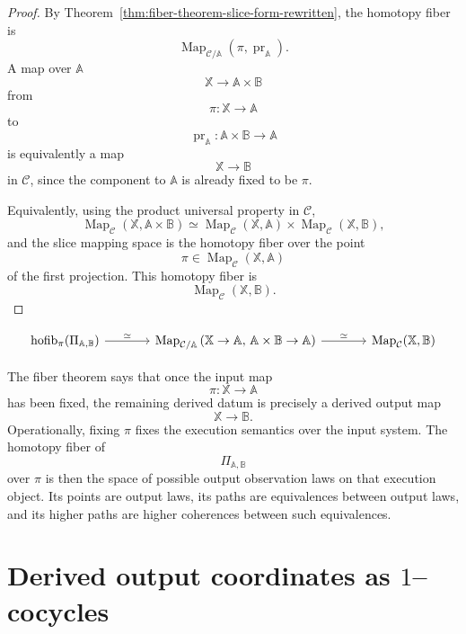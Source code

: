 \begin{proof}
By Theorem~\ref{thm:fiber-theorem-slice-form-rewritten}, the homotopy
fiber is
\[
\operatorname{Map}_{\mathcal C/\mathbb A}
\left(
\pi,\operatorname{pr}_{\mathbb A}
\right).
\]
A map over \(\mathbb A\)
\[
\mathbb X\to\mathbb A\times\mathbb B
\]
from
\[
\pi:\mathbb X\to\mathbb A
\]
to
\[
\operatorname{pr}_{\mathbb A}:\mathbb A\times\mathbb B\to\mathbb A
\]
is equivalently a map
\[
\mathbb X\to\mathbb B
\]
in \(\mathcal C\), since the component to \(\mathbb A\) is already fixed
to be \(\pi\).

Equivalently, using the product universal property in \(\mathcal C\),
\[
\operatorname{Map}_{\mathcal C}
(\mathbb X,\mathbb A\times\mathbb B)
\simeq
\operatorname{Map}_{\mathcal C}(\mathbb X,\mathbb A)
\times
\operatorname{Map}_{\mathcal C}(\mathbb X,\mathbb B),
\]
and the slice mapping space is the homotopy fiber over the point
\[
\pi\in\operatorname{Map}_{\mathcal C}(\mathbb X,\mathbb A)
\]
of the first projection. This homotopy fiber is
\[
\operatorname{Map}_{\mathcal C}(\mathbb X,\mathbb B).
\]
\end{proof}

\[
\begin{tikzcd}[column sep=large]
\operatorname{hofib}_{\pi}(\Pi_{\mathbb A,\mathbb B})
\arrow[r, "\simeq"]
&
\operatorname{Map}_{\mathcal C/\mathbb A}
\left(
\mathbb X\to\mathbb A,\,
\mathbb A\times\mathbb B\to\mathbb A
\right)
\arrow[r, "\simeq"]
&
\operatorname{Map}_{\mathcal C}(\mathbb X,\mathbb B)
\end{tikzcd}
\]

\begin{remark}
\label{rem:fiber-theorem-meaning-rewritten}
The fiber theorem says that once the input map
\[
\pi:\mathbb X\to\mathbb A
\]
has been fixed, the remaining derived datum is precisely a derived
output map
\[
\mathbb X\to\mathbb B.
\]
Operationally, fixing \(\pi\) fixes the execution semantics over the
input system. The homotopy fiber of
\[
\Pi_{\mathbb A,\mathbb B}
\]
over \(\pi\) is then the space of possible output observation laws on
that execution object. Its points are output laws, its paths are
equivalences between output laws, and its higher paths are higher
coherences between such equivalences.
\end{remark}

\section{\texorpdfstring{Derived output coordinates as $1$--cocycles}{Derived output coordinates as 1-cocycles}}
\label{sec:derived-output-one-cocycles-rewritten}

